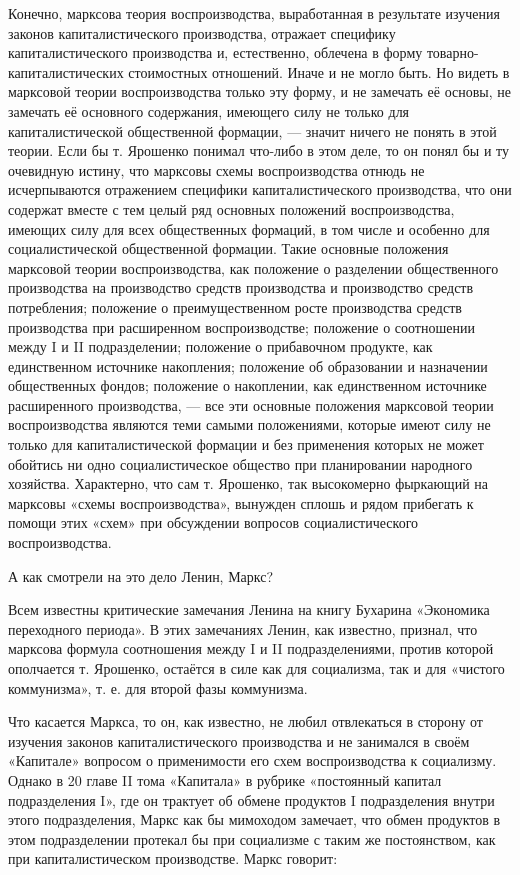 \documentclass[12pt, a4paper, openany]{book}
\begin{document}
Конечно, марксова теория воспроизводства, выработанная в результате изучения законов капиталистического производства, отражает специфику капиталистического производства и, естественно, облечена в форму товарно-капиталистических стоимостных отношений. Иначе и не могло быть. Но видеть в марксовой теории воспроизводства только эту форму, и не замечать её основы, не замечать её основного содержания, имеющего силу не только для капиталистической общественной формации, — значит ничего не понять в этой теории. Если бы т. Ярошенко понимал что-либо в этом деле, то он понял бы и ту очевидную истину, что марксовы схемы воспроизводства отнюдь не исчерпываются отражением специфики капиталистического производства, что они содержат вместе с тем целый ряд основных положений воспроизводства, имеющих силу для всех общественных формаций, в том числе и особенно для социалистической общественной формации. Такие основные положения марксовой теории воспроизводства, как положение о разделении общественного производства на производство средств производства и производство средств потребления; положение о преимущественном росте производства средств производства при расширенном воспроизводстве; положение о соотношении между I и II подразделении; положение о прибавочном продукте, как единственном источнике накопления; положение об образовании и назначении общественных фондов; положение о накоплении, как единственном источнике расширенного производства, — все эти основные положения марксовой теории воспроизводства являются теми самыми положениями, которые имеют силу не только для капиталистической формации и без применения которых не может обойтись ни одно социалистическое общество при планировании народного хозяйства. Характерно, что сам т. Ярошенко, так высокомерно фыркающий на марксовы «схемы воспроизводства», вынужден сплошь и рядом прибегать к помощи этих «схем» при обсуждении вопросов социалистического воспроизводства.



А как смотрели на это дело Ленин, Маркс?



Всем известны критические замечания Ленина на книгу Бухарина «Экономика переходного периода». В этих замечаниях Ленин, как известно, признал, что марксова формула соотношения между I и II подразделениями, против которой ополчается т. Ярошенко, остаётся в силе как для социализма, так и для «чистого коммунизма», т. е. для второй фазы коммунизма.



Что касается Маркса, то он, как известно, не любил отвлекаться в сторону от изучения законов капиталистического производства и не занимался в своём «Капитале» вопросом о применимости его схем воспроизводства к социализму. Однако в 20 главе II тома «Капитала» в рубрике «постоянный капитал подразделения I», где он трактует об обмене продуктов I подразделения внутри этого подразделения, Маркс как бы мимоходом замечает, что обмен продуктов в этом подразделении протекал бы при социализме с таким же постоянством, как при капиталистическом производстве. Маркс говорит:
\end{document}
